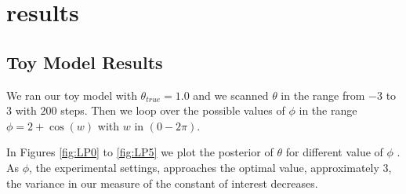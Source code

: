 \documentclass[10pt,journal,compsoc]{IEEEtran}
\begin{document}

\section{results}
\subsection{Toy Model Results}
We ran our toy model with $\theta_{true}=1.0$ and we scanned $\theta$ in the range from $-3$ to $3$ with $200$ steps. Then we loop over the possible values of $\phi$ in the range $ \phi = 2+\cos(w)$ with $w$ in $(0-2\pi)$.

In Figures \ref{fig:LP0} to \ref{fig:LP5} we plot the posterior of $\theta$ for different value of $\phi$ . As $\phi$, the experimental settings, approaches the optimal value, approximately $3$, the variance in our measure of the constant of interest decreases.
\end{document}
